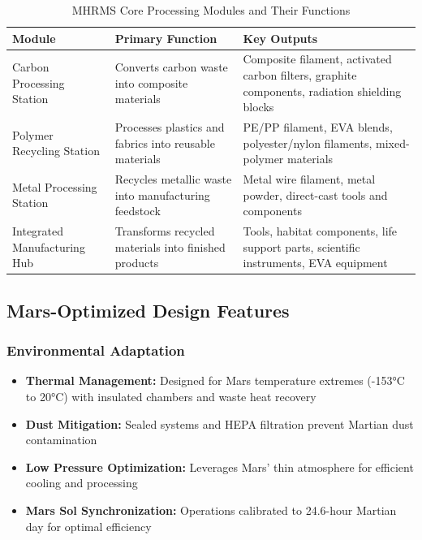 \documentclass[12pt, a4paper]{article}
\begin{document}
\begin{table}[h!]
\centering
\small
\renewcommand{\arraystretch}{1.4}
\setlength{\tabcolsep}{8pt}
\begin{tabular}{p{} p{} p{}}
\toprule
\textbf{Module} & \textbf{Primary Function} & \textbf{Key Outputs} \\
\midrule
Carbon Processing Station & Converts carbon waste into composite materials & Composite filament, activated carbon filters, graphite components, radiation shielding blocks \\[0.5em]

Polymer Recycling Station & Processes plastics and fabrics into reusable materials & PE/PP filament, EVA blends, polyester/nylon filaments, mixed-polymer materials \\[0.5em]

Metal Processing Station & Recycles metallic waste into manufacturing feedstock & Metal wire filament, metal powder, direct-cast tools and components \\[0.5em]

Integrated Manufacturing Hub & Transforms recycled materials into finished products & Tools, habitat components, life support parts, scientific instruments, EVA equipment \\
\bottomrule
\end{tabular}
\caption{MHRMS Core Processing Modules and Their Functions}
\end{table}
\normalsize

\subsection{Mars-Optimized Design Features}

\subsubsection{Environmental Adaptation}
\begin{itemize}
    \item \textbf{Thermal Management:} Designed for Mars temperature extremes (-153°C to 20°C) with insulated chambers and waste heat recovery
    \item \textbf{Dust Mitigation:} Sealed systems and HEPA filtration prevent Martian dust contamination
    \item \textbf{Low Pressure Optimization:} Leverages Mars' thin atmosphere for efficient cooling and processing
    \item \textbf{Mars Sol Synchronization:} Operations calibrated to 24.6-hour Martian day for optimal efficiency
\end{itemize}
\end{document}
